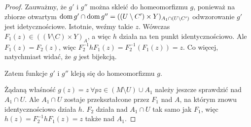 \begin{lem}
\begin{proof}
    Zauważmy, że $g'$ i $g''$ można skleić do homeomorfizmu $g$, ponieważ na zbiorze otwartym $\operatorname{dom} g'\cap \operatorname{dom} g'' = ((U\setminus C')\times Y)_{A_1 \cap (U\setminus C')}$ odwzorowanie $g'$ jest idetycznościowe. Istotnie, weźmy takie $z$. Wówczas $F_1(z) \in ((V\setminus C) \times Y)_{A}$, a więc $h$ działa na ten punkt identycznościowo. Ale $F_1(z) = F_2(z)$, więc $F_2^{-1} h F_1(z) = F_2^{-1}(F_1(z)) = z$. Co więcej, natychmiast widać, że $g$ jest bijekcją.
    
    Zatem funkcje $g'$ i $g''$ kleją się do homeomorfizmu $g$.
    
    Żądaną właśność $g(z) = z\ \forall pz \in (M\setminus U) \cup A_1$ należy jeszcze sprawdzić nad $A_1\cap U$. Ale $A_1\cap U$ zostaje przekształcone przez $F_1$ nad $A$, na którym znowu identycznościowo działa $h$. $F_2$ działa nad $A_1 \cap U$ tak samo jak $F_1$, więc $h(z) = F_2^{-1}hF_1(z) = z$ także nad $A_1$.
  \end{proof}
\end{lem}

